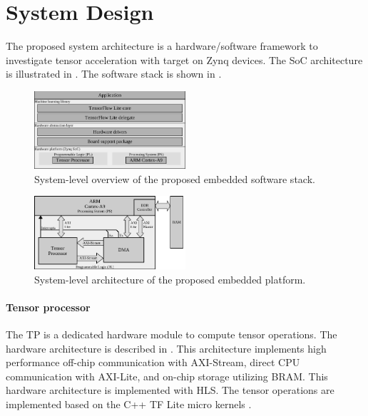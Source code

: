 \section{System Design}
\label{sec:system_design}
The proposed system architecture is a hardware/software framework to investigate tensor acceleration with target on Zynq devices. The SoC architecture is illustrated in . The software stack is shown in .

\begin{figure}[t!]
	\centering
	\includegraphics[width=0.5\textwidth]{../figures/sw_stack.pdf}
	\caption{System-level overview of the proposed embedded software stack.}
	\label{fig:sw_stack}
\end{figure}

\begin{figure}[t!]
	\centering
	\includegraphics[width=0.5\textwidth]{../figures/system_design.pdf}
	\caption{System-level architecture of the proposed embedded platform.}
	\label{fig:system_architecture}
\end{figure}

\paragraph{Tensor processor}
The TP is a dedicated hardware module to compute tensor operations. The hardware architecture is described in . This architecture implements high performance off-chip communication with AXI-Stream, direct CPU communication with AXI-Lite, and on-chip storage utilizing BRAM. This hardware architecture is implemented with HLS. The tensor operations are implemented based on the C++ TF Lite micro kernels \cite{tfLiteMicro}.

